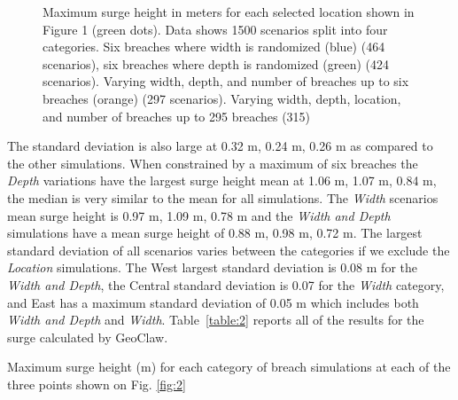 \documentclass{coastal_paper}
\begin{document}
\begin{figure}[ht]
    \centering
    \resizebox{\textwidth}{!}{%
            
        }
    \caption{Maximum surge height in meters for each selected location shown in Figure 1 (green dots). Data shows 1500 scenarios split into four categories. Six breaches where width is randomized (blue) (464 scenarios), six breaches where depth is randomized (green) (424 scenarios). Varying width, depth, and number of breaches up to six breaches (orange) (297 scenarios). Varying width, depth, location, and number of breaches up to 295 breaches (315)}
    \label{fig:3}
\end{figure}

The standard deviation is also large at 0.32 m, 0.24 m, 0.26 m as compared to the other simulations. When constrained by a maximum of six breaches the \emph{Depth} variations have the largest surge height mean at 1.06 m, 1.07 m, 0.84 m, the median is very similar to the mean for all simulations. The \emph{Width} scenarios mean surge height is 0.97 m, 1.09 m, 0.78 m and the \emph{Width and Depth} simulations have a mean surge height of 0.88 m, 0.98 m, 0.72 m.
 The largest standard deviation of all scenarios varies between the categories if we exclude the \emph{Location} simulations. The West largest standard deviation is 0.08 m for the \emph{Width and Depth}, the Central standard deviation is 0.07 for the \emph{Width} category, and East has a maximum standard deviation of 0.05 m which includes both \emph{Width and Depth} and \emph{Width}. Table~\ref{table:2} reports all of the results for the surge calculated by GeoClaw.
 
\begin{table}[ht]
    \begin{adjustbox}{width=0.9\textwidth} %
    
    \end{adjustbox}
    \caption{Maximum surge height (m) for each category of breach simulations at each of the three points shown on Fig. \ref{fig:2}}
    \label{table:2}
\end{table}
\end{document}
